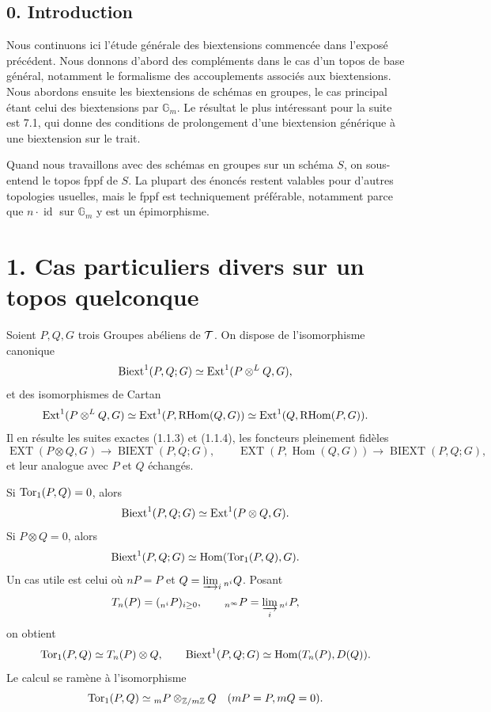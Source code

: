 \documentclass[11pt]{article}
\providecommand{\Gm}{\mathbb G_m}
\providecommand{\liminj}{\varinjlim}
\providecommand{\Hom}{\operatorname{Hom}}
\providecommand{\Ext}{\operatorname{Ext}}
\providecommand{\id}{\operatorname{id}}
\begin{document}
\subsection*{0. Introduction}

Nous continuons ici l'étude générale des biextensions commencée dans l'exposé précédent.  Nous donnons d'abord des compléments dans le cas d'un topos de base général, notamment le formalisme des accouplements associés aux biextensions.  Nous abordons ensuite les biextensions de schémas en groupes, le cas principal étant celui des biextensions par \(\Gm\).  Le résultat le plus intéressant pour la suite est 7.1, qui donne des conditions de prolongement d'une biextension générique à une biextension sur le trait.

Quand nous travaillons avec des schémas en groupes sur un schéma \(S\), on sous-entend le topos fppf de \(S\).  La plupart des énoncés restent valables pour d'autres topologies usuelles, mais le fppf est techniquement préférable, notamment parce que \(n\cdot\id\) sur \(\Gm\) y est un épimorphisme.

\section*{1. Cas particuliers divers sur un topos quelconque}

Soient \(P,Q,G\) trois Groupes abéliens de \(\mathcal T\).  On dispose de l'isomorphisme canonique
\[
        \Biext^1(P,Q;G)\simeq \Ext^1(P\otimes^L Q,G),
\]
et des isomorphismes de Cartan
\[
        \Ext^1(P\otimes^L Q,G)
        \simeq \Ext^1(P,\RHom(Q,G))
        \simeq \Ext^1(Q,\RHom(P,G)).
\]
Il en résulte les suites exactes (1.1.3) et (1.1.4), les foncteurs pleinement fidèles
\[
        \operatorname{EXT}(P\otimes Q,G)\to\operatorname{BIEXT}(P,Q;G),
        \qquad
        \operatorname{EXT}(P,\Hom(Q,G))\to\operatorname{BIEXT}(P,Q;G),
\]
et leur analogue avec \(P\) et \(Q\) échangés.

Si \(\operatorname{Tor}_1(P,Q)=0\), alors
\[
        \Biext^1(P,Q;G)\simeq\Ext^1(P\otimes Q,G).
\]
Si \(P\otimes Q=0\), alors
\[
        \Biext^1(P,Q;G)\simeq \Hom(\Torop_1(P,Q),G).
\]
Un cas utile est celui où \(nP=P\) et \(Q=\liminj_i {}_{n^i}Q\).  Posant
\[
        T_n(P)=({}_{n^i}P)_{i\ge0},
        \qquad {}_{n^\infty}P=\liminj_i {}_{n^i}P,
\]
on obtient
\[
        \Torop_1(P,Q)\simeq T_n(P)\otimes Q,
        \qquad
        \Biext^1(P,Q;G)\simeq \Hom(T_n(P),D(Q)).
\]
Le calcul se ramène à l'isomorphisme
\[
        \operatorname{Tor}_1(P,Q)\simeq {}_mP\otimes_{\mathbb Z/m\mathbb Z}Q
        \quad(mP=P,\\ mQ=0).
\]
\end{document}
